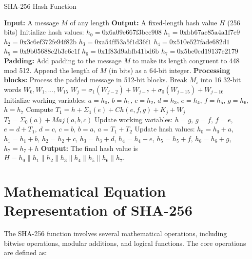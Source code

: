 \begin{algorithm}
\caption{SHA-256 Hash Function}
\begin{algorithmic}
\State \textbf{Input:} A message \( M \) of any length
\State \textbf{Output:} A fixed-length hash value \( H \) (256 bits)
\State Initialize hash values:
\State \( h_0 = \text{0x6a09e667f3bcc908} \)
\State \( h_1 = \text{0xbb67ae85a4a1f7e9} \)
\State \( h_2 = \text{0x3c6ef372fe94f82b} \)
\State \( h_3 = \text{0xa54ff53a5f1d36f1} \)
\State \( h_4 = \text{0x510e527fade682d1} \)
\State \( h_5 = \text{0x9b05688c2b3e6c1f} \)
\State \( h_6 = \text{0x1f83d9abfb41bd6b} \)
\State \( h_7 = \text{0x5be0cd19137e2179} \)
\State \textbf{Padding:} Add padding to the message \( M \) to make its length congruent to 448 mod 512.
\State Append the length of \( M \) (in bits) as a 64-bit integer.
\State \textbf{Processing blocks:} Process the padded message in 512-bit blocks.
    \State Break \( M_i \) into 16 32-bit words \( W_0, W_1, ..., W_{15} \)
        \State \( W_j = \sigma_1(W_{j-2}) + W_{j-7} + \sigma_0(W_{j-15}) + W_{j-16} \)
    \EndFor
    \State Initialize working variables:
    \State \( a = h_0 \), \( b = h_1 \), \( c = h_2 \), \( d = h_3 \), \( e = h_4 \), \( f = h_5 \), \( g = h_6 \), \( h = h_7 \)
        \State Compute \( T_1 = h + \Sigma_1(e) + Ch(e,f,g) + K_j + W_j \)
        \State \( T_2 = \Sigma_0(a) + Maj(a,b,c) \)
        \State Update working variables:
        \State \( h = g \), \( g = f \), \( f = e \), \( e = d + T_1 \), \( d = c \), \( c = b \), \( b = a \), \( a = T_1 + T_2 \)
    \EndFor
    \State Update hash values:
    \State \( h_0 = h_0 + a \), \( h_1 = h_1 + b \), \( h_2 = h_2 + c \), \( h_3 = h_3 + d \), 
    \State \( h_4 = h_4 + e \), \( h_5 = h_5 + f \), \( h_6 = h_6 + g \), \( h_7 = h_7 + h \)
\EndFor
\State \textbf{Output:} The final hash value is \( H = h_0 \parallel h_1 \parallel h_2 \parallel h_3 \parallel h_4 \parallel h_5 \parallel h_6 \parallel h_7 \).
\end{algorithmic}
\end{algorithm}

\section*{Mathematical Equation Representation of SHA-256}

The SHA-256 function involves several mathematical operations, including bitwise operations, modular additions, and logical functions. The core operations are defined as:

